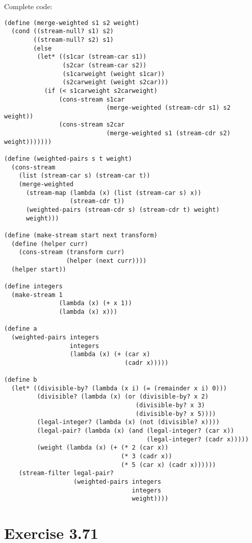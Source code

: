 \documentclass[../main.tex]{subfiles}
\begin{document}
Complete code:

\begin{lstlisting}
(define (merge-weighted s1 s2 weight)
  (cond ((stream-null? s1) s2)
        ((stream-null? s2) s1)
        (else
         (let* ((s1car (stream-car s1))
                (s2car (stream-car s2))
                (s1carweight (weight s1car))
                (s2carweight (weight s2car)))
           (if (< s1carweight s2carweight)
               (cons-stream s1car
                            (merge-weighted (stream-cdr s1) s2 weight))
               (cons-stream s2car
                            (merge-weighted s1 (stream-cdr s2) weight)))))))

(define (weighted-pairs s t weight)
  (cons-stream
    (list (stream-car s) (stream-car t))
    (merge-weighted
      (stream-map (lambda (x) (list (stream-car s) x))
                  (stream-cdr t))
      (weighted-pairs (stream-cdr s) (stream-cdr t) weight)
      weight)))

(define (make-stream start next transform)
  (define (helper curr)
    (cons-stream (transform curr)
                 (helper (next curr))))
  (helper start))

(define integers
  (make-stream 1
               (lambda (x) (+ x 1))
               (lambda (x) x)))

(define a
  (weighted-pairs integers
                  integers
                  (lambda (x) (+ (car x)
                                 (cadr x)))))

(define b
  (let* ((divisible-by? (lambda (x i) (= (remainder x i) 0)))
         (divisible? (lambda (x) (or (divisible-by? x 2)
                                    (divisible-by? x 3)
                                    (divisible-by? x 5))))
         (legal-integer? (lambda (x) (not (divisible? x))))
         (legal-pair? (lambda (x) (and (legal-integer? (car x))
                                       (legal-integer? (cadr x)))))
         (weight (lambda (x) (+ (* 2 (car x))
                                (* 3 (cadr x))
                                (* 5 (car x) (cadr x))))))
    (stream-filter legal-pair?
                   (weighted-pairs integers
                                   integers
                                   weight))))
\end{lstlisting}

\section{Exercise 3.71}
\end{document}
